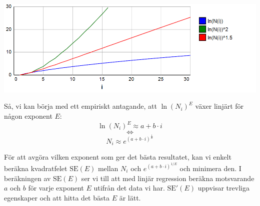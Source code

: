 \begin{center}
\includegraphics[scale=0.5]{Export/Complexity2.png}
\end{center}

Så, vi kan börja med ett empiriskt antagande, att $\ln(N_i)^E$ växer linjärt för någon exponent $E$:
\[\ln(N_i)^E \approx a+b\cdot i\]
\[\Longleftrightarrow\]
\[N_i \approx e^{(a+b\cdot i)^{\frac{1}{E}}} \]

För att avgöra vilken exponent som ger det bästa resultatet, kan vi enkelt beräkna kvadratfelet $\text{SE}(E)$ mellan $N_i$ och $e^{(a+b\cdot i)^{1/E}}$ och minimera den. I beräkningen av $\text{SE}(E)$ ser vi till att med linjär regression beräkna motsvarande $a$ och $b$ för varje exponent $E$ utifrån det data vi har. $\text{SE}'(E)$ uppvisar trevliga egenskaper och att hitta det bästa $E$ är lätt.

